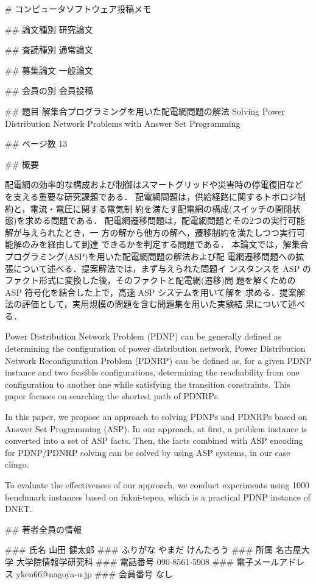 # コンピュータソフトウェア投稿メモ

## 論文種別
研究論文

## 査読種別
通常論文

## 募集論文
一般論文

## 会員の別
会員投稿

## 題目
解集合プログラミングを用いた配電網問題の解法
Solving Power Distribution Network Problems with Answer Set Programming

## ページ数
13

## 概要

配電網の効率的な構成および制御はスマートグリッドや災害時の停電復旧など
を支える重要な研究課題である．
配電網問題は，供給経路に関するトポロジ制約と，電流・電圧に関する電気制
約を満たす配電網の構成(スイッチの開閉状態)を求める問題である．
配電網遷移問題は，配電網問題とその2つの実行可能解が与えられたとき，一
方の解から他方の解へ，遷移制約を満たしつつ実行可能解のみを経由して到達
できるかを判定する問題である．
本論文では，解集合プログラミング(ASP)を用いた配電網問題の解法および配
電網遷移問題への拡張について述べる．提案解法では，まず与えられた問題イ
ンスタンスを ASP のファクト形式に変換した後，そのファクトと配電網(遷移)問
題を解くための ASP 符号化を結合した上で，高速 ASP システムを用いて解を
求める．提案解法の評価として，実用規模の問題を含む問題集を用いた実験結
果について述べる．

Power Distribution Network Problem (PDNP) can be generally 
defined as determining the configuration of power distribution network,
Power Distribution Network Reconfiguration Problem (PDNRP) can be
defined as, for a given PDNP instance and two feasible configurations,
determining the reachability from one configuration to another one
while satisfying the transition constraints.
This paper focuses on searching the shortest path of PDNRPs.

In this paper, we propose an approach to solving PDNPs and PDNRPs
based on Answer Set Programming (ASP).
In our approach, at first, a problem instance is converted into 
a set of ASP facts. 
Then, the facts combined with ASP encoding
for PDNP/PDNRP solving can be solved by using ASP systems,
in our case clingo.

To evaluate the effectiveness of our approach, we conduct experiments
using 1000 benchmark instances based on
fukui-tepco, which is a practical PDNP instance of DNET.

## 著者全員の情報

### 氏名
山田 健太郎
### ふりがな
やまだ けんたろう
### 所属
名古屋大学 大学院情報学研究科
### 電話番号
090-8561-5908
### 電子メールアドレス
yken66@nagoya-u.jp
### 会員番号
なし

